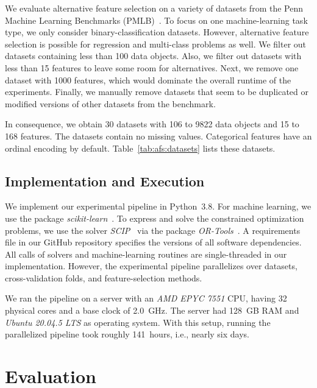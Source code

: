 \documentclass{article}
\theoremstyle{definition}
\begin{document}
%
We evaluate alternative feature selection on a variety of datasets from the Penn Machine Learning Benchmarks (PMLB)~\cite{olson2017pmlb,romano2021pmlb}.
To focus on one machine-learning task type, we only consider binary-classification datasets.
However, alternative feature selection is possible for regression and multi-class problems as well.
We filter out datasets containing less than 100 data objects.
Also, we filter out datasets with less than 15 features to leave some room for alternatives.
Next, we remove one dataset with 1000 features, which would dominate the overall runtime of the experiments.
Finally, we manually remove datasets that seem to be duplicated or modified versions of other datasets from the benchmark.

In consequence, we obtain 30 datasets with 106 to 9822 data objects and 15 to 168 features.
The datasets contain no missing values.
Categorical features have an ordinal encoding by default.
Table~\ref{tab:afs:datasets} lists these datasets.

\subsection{Implementation and Execution}
\label{sec:afs:experimental-design:implementation}

We implement our experimental pipeline in Python~3.8.
For machine learning, we use the package \emph{scikit-learn}~\cite{pedregosa2011scikit-learn}.
To express and solve the constrained optimization problems, we use the solver \emph{SCIP}~\cite{bestuzheva2021scip} via the package \emph{OR-Tools}~\cite{perron2022or-tools}.
A requirements file in our GitHub repository specifies the versions of all software dependencies.
All calls of solvers and machine-learning routines are single-threaded in our implementation.
However, the experimental pipeline parallelizes over datasets, cross-validation folds, and feature-selection methods.

We ran the pipeline on a server with an \emph{AMD EPYC 7551} CPU, having 32 physical cores and a base clock of 2.0~GHz.
The server had 128~GB RAM and \emph{Ubuntu 20.04.5 LTS} as operating system.
With this setup, running the parallelized pipeline took roughly 141~hours, i.e., nearly six days.

\section{Evaluation}
\label{sec:afs:evaluation}
\end{document}
